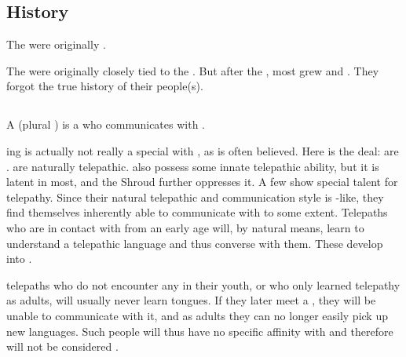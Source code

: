 








\subsection{History}
The \nycans{} were originally . 

The \nycans{} were originally closely tied to the . 
But after the \CuezcanApocalypse, most \nycans{} grew \quo{\Wylde} and .
They forgot the true history of their people(s). 









\subsection[Nycaneers]{\Nycaneers}
\index{\nycan!\nycaneer}
A \nycaneer{} (plural \emph{\nycaneers{}}) is a \scathaese{}  who communicates with \nycans{}. 

\Nycaneer ing is actually not really a special  with \nycans, as is often believed. 
Here is the deal: 
\Scathae{} are . \Nycans{} are naturally telepathic. 
\Scathae{} also possess some innate telepathic ability, but it is latent in most, and the Shroud further oppresses it. 
A few \scathae{} show special talent for telepathy. 
Since their natural telepathic  and communication style is \nycan-like, they find themselves inherently able to communicate with \nycans{} to some extent. 
Telepaths who are in contact with \nycans{} from an early age will, by natural means, learn to understand a telepathic \nycan{} language and thus converse with them. 
These develop into \nycaneers. 

\Scathaese{} telepaths who do not encounter any \nycans{} in their youth, or who only learned telepathy as adults, will usually never learn \nycan{} tongues. 
If they later meet a \nycan, they will be unable to communicate with it, and as adults they can no longer easily pick up new languages. 
Such people will thus have no specific affinity with \nycans{} and therefore will not be considered \nycaneers. 

